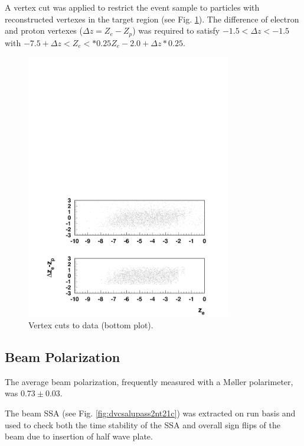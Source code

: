 \documentclass[11pt,a4paper]{article}
\begin{document}
A vertex cut was applied to restrict the event sample to particles
with reconstructed vertexes in the target region 
(see Fig. \ref{fig:e16vertexcut}). The difference of electron and proton vertexes ($\Delta z = Z_e-Z_p$) was required to satisfy
$
-1.5 <\Delta z < -1.5 $ 
with  $-7.5+\Delta z < Z_e < *0.25 Z_e -2.0+\Delta z*0.25 $.


\begin{figure}
\centering
\includegraphics[width=0.8\textwidth]{plots/e16vertexcut.pdf}
   \caption{ Vertex cuts to data (bottom plot). }
 \label{fig:e16vertexcut}
 \end{figure} 

\subsection{Beam Polarization}

The average beam polarization, frequently measured  with a 
M{\o}ller polarimeter, was  $0.73 \pm 0.03$.

The  beam SSA  (see Fig. \ref{fig:dvcsalupass2nt21c}) was extracted on
run basis and used to check both the time stability of the SSA and
overall sign flips of the beam due to insertion of half wave plate.
\end{document}

